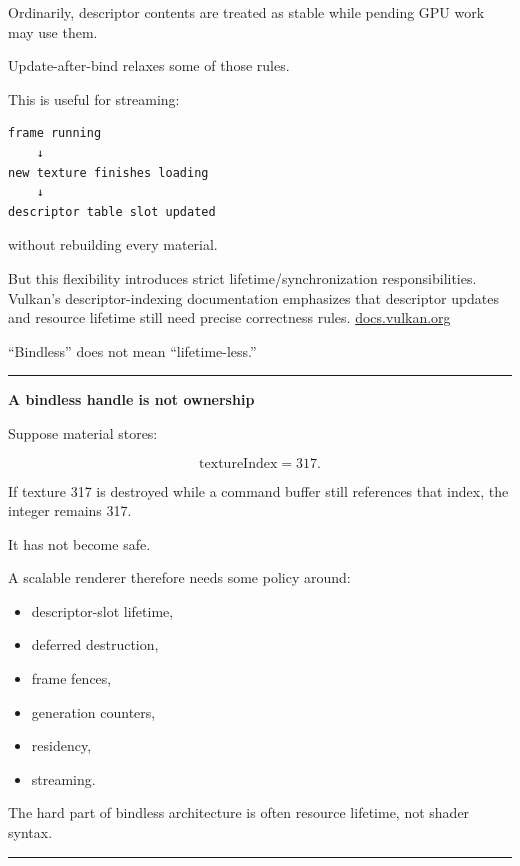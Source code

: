 Ordinarily, descriptor contents are treated as stable while pending GPU work may use them.

Update-after-bind relaxes some of those rules.

This is useful for streaming:

\begin{verbatim}
frame running
    ↓
new texture finishes loading
    ↓
descriptor table slot updated
\end{verbatim}

without rebuilding every material.

But this flexibility introduces strict lifetime/synchronization responsibilities. Vulkan's descriptor-indexing documentation emphasizes that descriptor updates and resource lifetime still need precise correctness rules. \href{https://docs.vulkan.org/tutorial/latest/Building_a_Simple_Engine/Advanced_Topics/Descriptor_Indexing_UpdateAfterBind.html?utm_source=chatgpt.com}{docs.vulkan.org}

``Bindless'' does not mean ``lifetime-less.''

\begin{center}\rule{0.5\linewidth}{0.5pt}\end{center}

\textbf{A bindless handle is not ownership}

Suppose material stores:

\[
\text{textureIndex}=317.
\]

If texture 317 is destroyed while a command buffer still references that index, the integer remains 317.

It has not become safe.

A scalable renderer therefore needs some policy around:

\begin{itemize}
\tightlist
\item
  descriptor-slot lifetime,
\item
  deferred destruction,
\item
  frame fences,
\item
  generation counters,
\item
  residency,
\item
  streaming.
\end{itemize}

The hard part of bindless architecture is often resource lifetime, not shader syntax.

\begin{center}\rule{0.5\linewidth}{0.5pt}\end{center}

